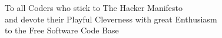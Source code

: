 %
%
%
%
%
%

\vspace*{3cm}
\begin{center}
    To all Coders who stick to The Hacker Manifesto\\
    and devote their Playful Cleverness with great Enthusiasm\\
    to the Free Software Code Base
\end{center}
